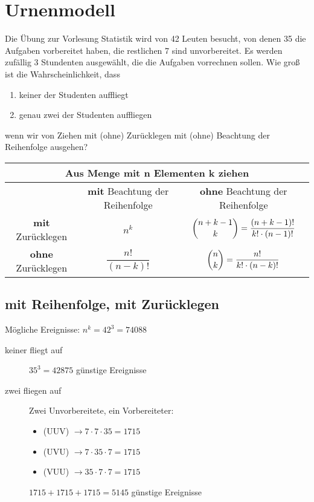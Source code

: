 \documentclass[11pt, a4paper]{article}
\begin{document}
\section{Urnenmodell}
Die Übung zur Vorlesung Statistik wird von 42 Leuten besucht, von denen 35 die Aufgaben vorbereitet haben, die restlichen 7 sind unvorbereitet. Es werden zufällig 3 Stundenten ausgewählt, die die Aufgaben vorrechnen sollen. Wie groß ist die Wahrscheinlichkeit, dass
\begin{enumerate}
	\item keiner der Studenten auffliegt
	\item genau zwei der Studenten auffliegen
\end{enumerate}
wenn wir von Ziehen mit (ohne) Zurücklegen mit (ohne) Beachtung der Reihenfolge ausgehen?

\vspace{\baselineskip}
\begin{tabular}{|c||c|c|}
	\hline
	\multicolumn{3}{|c|}{Aus Menge mit \textbf{n} Elementen \textbf{k} ziehen} \\
	\hline
	 & \textbf{mit} Beachtung der Reihenfolge & \textbf{ohne} Beachtung der Reihenfolge \\
	\hline \hline
	\textbf{mit} Zurücklegen & $n^k$ & $\dbinom{n+k-1}{k} = \dfrac{(n+k-1)!}{k!\cdot (n-1)!}$ \\
	\hline
	\textbf{ohne} Zurücklegen & $\dfrac{n!}{(n-k)!}$ & $\dbinom{n}{k} = \dfrac{n!}{k!\cdot (n-k)!}$ \\
\hline
\end{tabular}

\subsection{mit Reihenfolge, mit Zurücklegen}
Mögliche Ereignisse: $n^k = 42^3 = 74088$
\begin{description}
	\item[keiner fliegt auf] $35^3 = 42875$  günstige Ereignisse
	\item[zwei fliegen auf] Zwei Unvorbereitete, ein Vorbereiteter:
		\begin{itemize}
			\item (UUV) $\rightarrow 7 \cdot 7 \cdot 35 = 1715$
			\item (UVU) $\rightarrow 7 \cdot 35 \cdot 7 = 1715$
			\item (VUU) $\rightarrow 35 \cdot 7 \cdot 7 = 1715$
		\end{itemize}
		$1715 + 1715 + 1715 = 5145$ günstige Ereignisse
\end{description}
\end{document}
